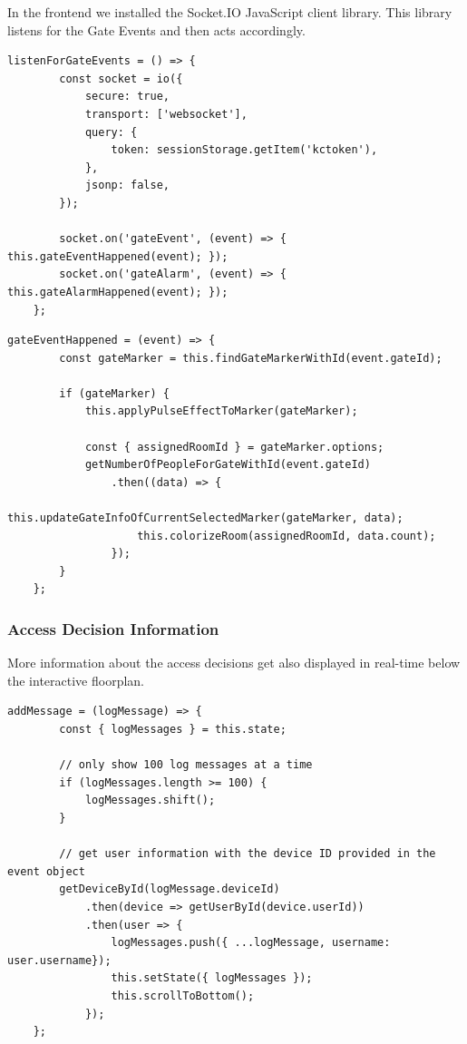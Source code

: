 In the frontend we installed the Socket.IO JavaScript client library. This library listens for the Gate Events and then acts accordingly.

\begin{lstlisting}[label=socketIOClientSide]
listenForGateEvents = () => {
        const socket = io({
            secure: true,
            transport: ['websocket'],
            query: {
                token: sessionStorage.getItem('kctoken'),
            },
            jsonp: false,
        });

        socket.on('gateEvent', (event) => { this.gateEventHappened(event); });
        socket.on('gateAlarm', (event) => { this.gateAlarmHappened(event); });
    };
\end{lstlisting}

\begin{lstlisting}[label=gateEventHappened]
gateEventHappened = (event) => {
        const gateMarker = this.findGateMarkerWithId(event.gateId);

        if (gateMarker) {
            this.applyPulseEffectToMarker(gateMarker);

            const { assignedRoomId } = gateMarker.options;
            getNumberOfPeopleForGateWithId(event.gateId)
                .then((data) => {
                    this.updateGateInfoOfCurrentSelectedMarker(gateMarker, data);
                    this.colorizeRoom(assignedRoomId, data.count);
                });
        }
    };
\end{lstlisting}



\subsubsection{Access Decision Information}

More information about the access decisions get also displayed in real-time below the interactive floorplan.

\begin{lstlisting}[label=addMessage]
addMessage = (logMessage) => {
        const { logMessages } = this.state;
        
        // only show 100 log messages at a time
        if (logMessages.length >= 100) {
            logMessages.shift();
        }

		// get user information with the device ID provided in the event object
        getDeviceById(logMessage.deviceId)
            .then(device => getUserById(device.userId))
            .then(user => {
                logMessages.push({ ...logMessage, username: user.username});
                this.setState({ logMessages });
                this.scrollToBottom();
            });
    };
\end{lstlisting}
    

